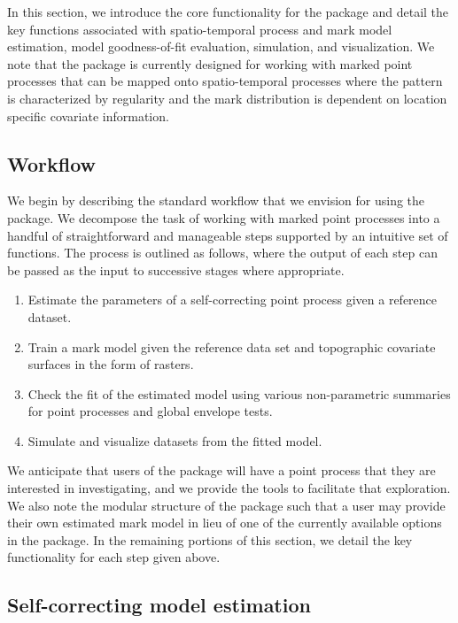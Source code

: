 In this section, we introduce the core functionality for the
 package and detail the key functions associated with
spatio-temporal process and mark model estimation, model goodness-of-fit
evaluation, simulation, and visualization. We note that the package is
currently designed for working with marked point processes that can be
mapped onto spatio-temporal processes where the pattern is characterized
by regularity and the mark distribution is dependent on location
specific covariate information.

\subsection{Workflow}\label{workflow}

We begin by describing the standard workflow that we envision for using
the package. We decompose the task of working with marked point
processes into a handful of straightforward and manageable steps
supported by an intuitive set of functions. {The process is outlined
as follows, where the output of each step can be passed as the input to successive stages where appropriate.}

\begin{enumerate}
\def\labelenumi{\arabic{enumi}.}
\tightlist
\item
  Estimate the parameters of a self-correcting point process given a
  reference dataset.
\item
  Train a mark model given the reference data set and topographic
  covariate surfaces in the form of rasters.
\item
  Check the fit of the estimated model using various non-parametric
  summaries for point processes and global envelope tests.
\item
  Simulate and visualize datasets from the fitted model.
\end{enumerate}

We anticipate that users of the package will have a point process that
they are interested in investigating, and we provide the tools to
facilitate that exploration. We also note the modular structure of the
package such that a user may provide their own estimated mark model in
lieu of one of the currently available options in the package. In the
remaining portions of this section, we detail the key functionality for
each step given above.

\subsection{Self-correcting model estimation}\label{scestimation}


